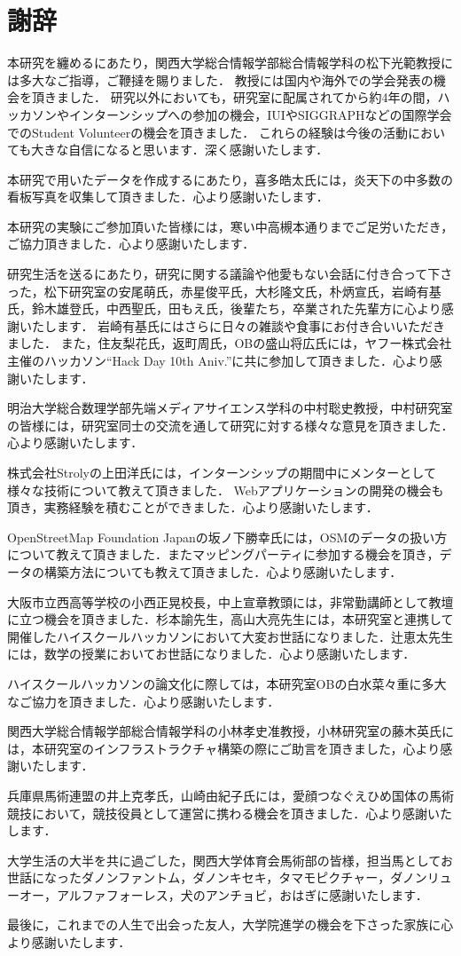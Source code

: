 \chapter*{謝辞}
本研究を纏めるにあたり，関西大学総合情報学部総合情報学科の松下光範教授には多大なご指導，ご鞭撻を賜りました．
教授には国内や海外での学会発表の機会を頂きました．
研究以外においても，研究室に配属されてから約4年の間，ハッカソンやインターンシップへの参加の機会，IUIやSIGGRAPHなどの国際学会でのStudent Volunteerの機会を頂きました．
これらの経験は今後の活動においても大きな自信になると思います．深く感謝いたします．

本研究で用いたデータを作成するにあたり，喜多皓太氏には，炎天下の中多数の看板写真を収集して頂きました．心より感謝いたします．

本研究の実験にご参加頂いた皆様には，寒い中高槻本通りまでご足労いただき，ご協力頂きました．心より感謝いたします．

研究生活を送るにあたり，研究に関する議論や他愛もない会話に付き合って下さった，松下研究室の安尾萌氏，赤星俊平氏，大杉隆文氏，朴炳宣氏，岩崎有基氏，鈴木雄登氏，中西聖氏，田もえ氏，後輩たち，卒業された先輩方に心より感謝いたします．
岩崎有基氏にはさらに日々の雑談や食事にお付き合いいただきました．
また，住友梨花氏，返町周氏，OBの盛山将広氏には，ヤフー株式会社主催のハッカソン``Hack Day 10th Aniv.''に共に参加して頂きました．心より感謝いたします．

明治大学総合数理学部先端メディアサイエンス学科の中村聡史教授，中村研究室の皆様には，研究室同士の交流を通して研究に対する様々な意見を頂きました．心より感謝いたします．

株式会社Strolyの上田洋氏には，インターンシップの期間中にメンターとして様々な技術について教えて頂きました．
Webアプリケーションの開発の機会も頂き，実務経験を積むことができました．心より感謝いたします．

OpenStreetMap Foundation Japanの坂ノ下勝幸氏には，OSMのデータの扱い方について教えて頂きました．またマッピングパーティに参加する機会を頂き，データの構築方法についても教えて頂きました．心より感謝いたします．

大阪市立西高等学校の小西正晃校長，中上宣章教頭には，非常勤講師として教壇に立つ機会を頂きました．杉本諭先生，高山大亮先生には，本研究室と連携して開催したハイスクールハッカソンにおいて大変お世話になりました．辻恵太先生には，数学の授業においてお世話になりました．心より感謝いたします．

ハイスクールハッカソンの論文化に際しては，本研究室OBの白水菜々重に多大なご協力を頂きました．心より感謝いたします．

関西大学総合情報学部総合情報学科の小林孝史准教授，小林研究室の藤木英氏には，本研究室のインフラストラクチャ構築の際にご助言を頂きました，心より感謝いたします．

兵庫県馬術連盟の井上克孝氏，山崎由紀子氏には，愛顔つなぐえひめ国体の馬術競技において，競技役員として運営に携わる機会を頂きました．心より感謝いたします．

大学生活の大半を共に過ごした，関西大学体育会馬術部の皆様，担当馬としてお世話になったダノンファントム，ダノンキセキ，タマモピクチャー，ダノンリューオー，アルファフォーレス，犬のアンチョビ，おはぎに感謝いたします．

最後に，これまでの人生で出会った友人，大学院進学の機会を下さった家族に心より感謝いたします．